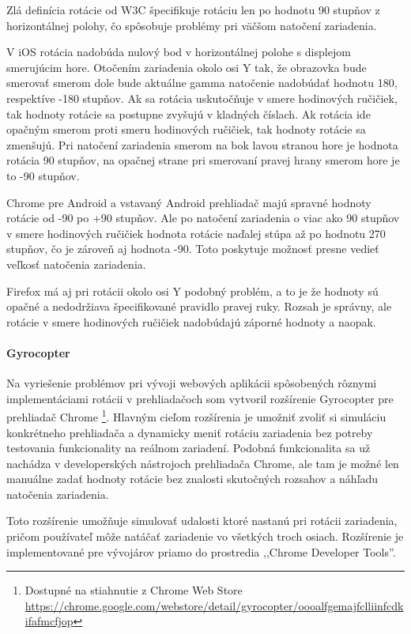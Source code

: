 Zlá definícia rotácie od W3C špecifikuje rotáciu len po hodnotu 90 stupňov z horizontálnej polohy, čo spôsobuje problémy pri väčšom natočení zariadenia.

V iOS rotácia nadobúda nulový bod v horizontálnej polohe s displejom smerujúcim hore. Otočením zariadenia okolo osi Y tak, že obrazovka bude smerovať smerom dole bude aktuálne gamma natočenie nadobúdať hodnotu 180, respektíve -180 stupňov. Ak sa rotácia uskutočňuje v smere hodinových ručičiek, tak hodnoty rotácie sa postupne zvyšujú v kladných číslach. Ak rotácia ide opačným smerom proti smeru hodinových ručičiek, tak hodnoty rotácie sa zmenšujú. Pri natočení zariadenia smerom na bok lavou stranou hore je hodnota rotácia 90 stupňov, na opačnej strane pri smerovaní pravej hrany smerom hore je to -90 stupňov.

Chrome pre Android a vstavaný Android prehliadač majú spravné hodnoty rotácie od -90 po +90 stupňov. Ale po natočení zariadenia o viac ako 90 stupňov v smere hodinových ručičiek hodnota rotácie naďalej stúpa až po hodnotu 270 stupňov, čo je zároveň aj hodnota -90. Toto poskytuje možnosť presne vedieť veľkosť natočenia zariadenia.

Firefox má aj pri rotácii okolo osi Y podobný problém, a to je že hodnoty sú opačné a nedodržiava špecifikované pravidlo pravej ruky. Rozsah je správny, ale rotácie v smere hodinových ručičiek nadobúdajú záporné hodnoty a naopak.



\paragraph{Gyrocopter} %
\label{par:gyrocopter}

Na vyriešenie problémov pri vývoji webových aplikácii spôsobených rôznymi implementáciami rotácii v prehliadačoch som vytvoril rozšírenie Gyrocopter pre prehliadač Chrome \footnote{Dostupné na stiahnutie z Chrome Web Store \url{https://chrome.google.com/webstore/detail/gyrocopter/oooalfgemajfclliinfcdkifafmcfjop}}. Hlavným cieľom rozšírenia je umožniť zvoliť si simuláciu konkrétneho prehliadača a dynamicky meniť rotáciu zariadenia bez potreby testovania funkcionality na reálnom zariadení. Podobná funkcionalita sa už nachádza v developerských nástrojoch prehliadača Chrome, ale tam je možné len manuálne zadať hodnoty rotácie bez znalosti skutočných rozsahov a náhľadu natočenia zariadenia.

Toto rozšírenie umožňuje simulovať udalosti ktoré nastanú pri rotácii zariadenia, pričom používateľ môže natáčať zariadenie vo všetkých troch osiach. Rozšírenie je implementované pre vývojárov priamo do prostredia ,,Chrome Developer Tools''.

